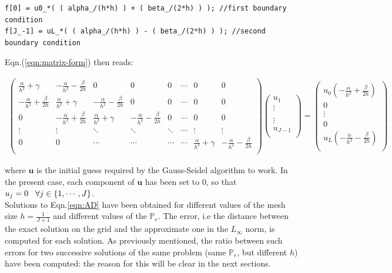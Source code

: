 \documentclass[11pt]{article}
\theoremstyle{theorem}
\theoremstyle{definition}
\begin{document}
\begin{lstlisting}
f[0] = u0_*( ( alpha_/(h*h) ) + ( beta_/(2*h) ) ); //first boundary condition
f[J_-1] = uL_*( ( alpha_/(h*h) ) - ( beta_/(2*h) ) ); //second boundary condition
\end{lstlisting}


Eqn.(\ref{eqn:matrix-form}) then reads:

\begin{align*}
	\begin{pmatrix}
	\frac{\alpha}{h^2}+\gamma & -\frac{\alpha}{h^2}-\frac{\beta}{2h} & 0 & 0 & 0 & \cdots & 0 & 0\\
	-\frac{\alpha}{h^2}+\frac{\beta}{2h} & \frac{\alpha}{h^2}+\gamma & -\frac{\alpha}{h^2}-\frac{\beta}{2h} & 0 & 0 & \cdots & 0 & 0\\
	0 & -\frac{\alpha}{h^2}+\frac{\beta}{2h} & \frac{\alpha}{h^2}+\gamma & -\frac{\alpha}{h^2}-\frac{\beta}{2h} & 0 & \cdots & 0 & 0\\
	\vdots & \vdots & \ddots & \ddots & \ddots & \cdots & \vdots & \vdots \\
	0 & 0 & \cdots & \cdots & \cdots & \cdots &  \frac{\alpha}{h^2}+\gamma & -\frac{\alpha}{h^2}-\frac{\beta}{2h}\\
	\end{pmatrix}
	\begin{pmatrix}
	u_1\\
	\vdots\\
	\\
	\vdots\\
	u_{J-1}\\		
	\end{pmatrix}
	=
	\begin{pmatrix}
	u_0\left(-\frac{\alpha}{h^2}+\frac{\beta}{2h}\right)\\
	0\\
	\vdots\\
	0\\
	u_{L}\left(-\frac{\alpha}{h^2}-\frac{\beta}{2h}\right)\\		
	\end{pmatrix}
\end{align*}

where $\mathbf{u}$ is the initial guess required by the Gauss-Seidel algorithm to work. In the present case, each component of $\mathbf{u}$ has been set to $0$, so that $u_j=0\hspace{3mm}\forall j\in\lbrace 1,\cdots, J\rbrace$.\\
Solutions to  Eqn.\eqref{eqn:AD} have been obtained for different values of the mesh size $h=\frac{1}{J+1}$ and different values of the $\mathbb{P}_e$. The error, i.e the distance between the exact solution on the grid and the approximate one in the $L_\infty$ norm, is computed for each solution. As previously mentioned, the ratio between such errors for two successive solutions of the same problem (same $\mathbb{P}_e$, but different $h$) have been computed: the reason for this will be clear in the next sections.\\
\end{document}
